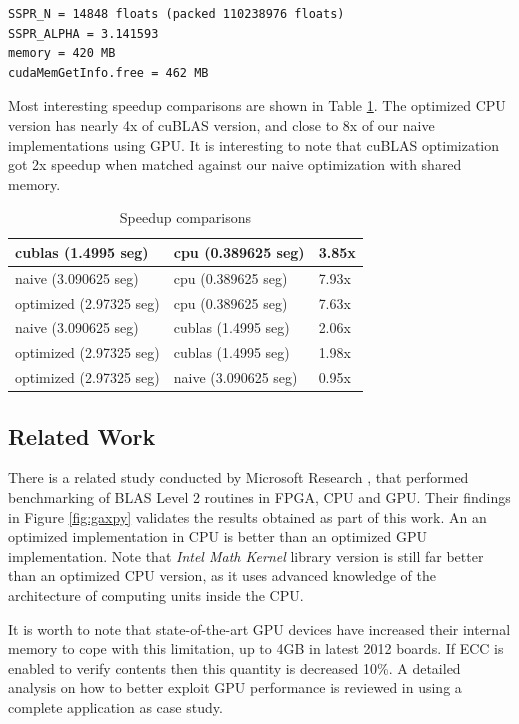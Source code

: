 \documentclass{llncs}
\begin{document}
\begin{verbatim}
SSPR_N = 14848 floats (packed 110238976 floats)
SSPR_ALPHA = 3.141593
memory = 420 MB
cudaMemGetInfo.free = 462 MB
\end{verbatim}

Most interesting speedup comparisons are shown in Table \ref{table:speedup}. The optimized CPU version has nearly 4x of cuBLAS version, and close to 8x of our naive implementations using GPU. It is interesting to note that cuBLAS optimization got 2x speedup when matched against our naive optimization with shared memory.

\begin{table}
\caption{Speedup comparisons}
\centering
\begin{tabular} {|l|l|l|} \hline
cublas (1.4995 seg) & cpu (0.389625 seg) & 3.85x \\ \hline
naive (3.090625 seg) & cpu (0.389625 seg) & 7.93x \\ \hline
optimized (2.97325 seg) & cpu (0.389625 seg) & 7.63x \\ \hline
naive (3.090625 seg) & cublas (1.4995 seg) & 2.06x \\ \hline
optimized (2.97325 seg) & cublas (1.4995 seg) & 1.98x \\ \hline
optimized (2.97325 seg) & naive (3.090625 seg) & 0.95x \\ \hline
\end{tabular}
\label{table:speedup}
\end{table}

\subsection{Related Work}

There is a related study conducted by Microsoft Research \cite{ms-gaxpy}, that performed benchmarking of BLAS Level
2 routines in FPGA, CPU and GPU. Their findings in Figure \ref{fig:gaxpy} validates the results obtained as part of this work. An an optimized implementation in CPU is better than an optimized GPU implementation. Note that {\it Intel Math Kernel} library version is still far better than an optimized CPU version, as it uses advanced knowledge of the architecture of computing units inside the CPU.

\smallskip

It is worth to note that state-of-the-art GPU devices have increased their internal memory to cope with this limitation, up to 4GB in latest 2012 boards. If ECC is enabled to verify contents then this quantity is decreased 10\%. A detailed analysis on how to better exploit GPU performance is reviewed in \cite{similar} using a complete application as case study.
\end{document}
